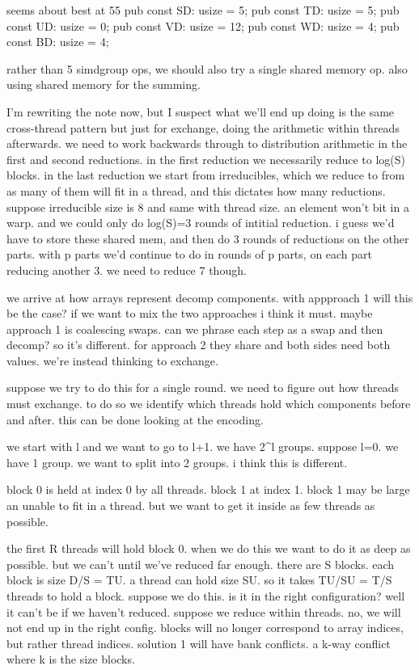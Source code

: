 seems about best at 55
    pub const SD: usize = 5;
    pub const TD: usize = 5;
    pub const UD: usize = 0;
    pub const VD: usize = 12;
    pub const WD: usize = 4;
    pub const BD: usize = 4;

rather than 5 simdgroup ops, we should also try a single shared memory op.
also using shared memory for the summing. 

I'm rewriting the note now, but I suspect what we'll end up doing is the same cross-thread pattern but just for exchange, doing the arithmetic within threads afterwards. we need to work backwards through to distribution arithmetic in the first and second reductions. in the first reduction we necessarily reduce to log(S) blocks. 
in the last reduction we start from irreducibles, which we reduce to from as many of them will fit in a thread, and this dictates how many reductions.
suppose irreducible size is 8 and same with thread size. an element won't bit in a warp. and we could only do log(S)=3 rounds of intitial reduction. i guess we'd have to store these shared mem, and then do 3 rounds of reductions on the other parts. with p parts we'd continue to do in rounds of p parts, on each part reducing another 3. we need to reduce 7 though. 

we arrive at how arrays represent decomp components. 
with appproach 1 will this be the case? if we want to mix the two approaches i think it must.
maybe approach 1 is coalescing swaps. 
can we phrase each step as a swap and then decomp? 
so it's different. for approach 2 they share and both sides need both values. we're instead thinking to exchange.

suppose we try to do this for a single round. we need to figure out how threads must exchange.
to do so we identify which threads hold which components before and after.
this can be done looking at the encoding. 

we start with l and we want to go to l+1.
we have 2^l groups. suppose l=0. we have 1 group.
we want to split into 2 groups.
i think this is different. 

block 0 is held at index 0 by all threads.
block 1 at index 1. 
block 1 may be large an unable to fit in a thread. but we want to get it inside as few threads as possible.

the first R threads will hold block 0. 
when we do this we want to do it as deep as possible. but we can't until we've reduced far enough.
there are S blocks. each block is size D/S = TU. a thread can hold size SU. 
so it takes TU/SU = T/S threads to hold a block.
suppose we do this. is it in the right configuration? well it can't be if we haven't reduced. suppose we reduce within threads. 
no, we will not end up in the right config. blocks will no longer correspond to array indices, but rather thread indices.
solution 1 will have bank conflicts. a k-way conflict where k is the size blocks.

